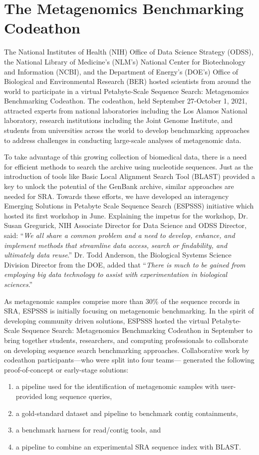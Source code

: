 \section{The Metagenomics Benchmarking Codeathon}
\label{sec:psss-codeathon}

The National Institutes of Health (NIH) Office of Data Science Strategy (ODSS), the National Library of Medicine’s (NLM’s) National Center for Biotechnology and Information (NCBI), and the Department of Energy’s (DOE’s) Office of Biological and Environmental Research (BER) hosted scientists from around the world to participate in a virtual Petabyte-Scale Sequence Search: Metagenomics Benchmarking Codeathon. The codeathon, held September 27-October 1, 2021, attracted experts from national laboratories including the Los Alamos National laboratory, research institutions including the Joint Genome Institute, and students from universities across the world to develop benchmarking approaches to address challenges in conducting large-scale analyses of metagenomic data.

To take advantage of this growing collection of biomedical data, there is a need for efficient methods to search the archive using nucleotide sequences. Just as the introduction of tools like Basic Local Alignment Search Tool (BLAST) provided a key to unlock the potential of the GenBank archive, similar approaches are needed for SRA. Towards these efforts, we have developed an interagency Emerging Solutions in Petabyte Scale Sequence Search (ESPSSS) initiative which hosted its first workshop in June. Explaining the impetus for the workshop, Dr. Susan Gregurick, NIH Associate Director for Data Science and ODSS Director, said: “{\it We all share a common problem and a need to develop, enhance, and implement methods that streamline data access, search or findability, and ultimately data reuse}.” Dr. Todd Anderson, the Biological Systems Science Division Director from the DOE, added that “{\it There is much to be gained from employing big data technology to assist with experimentation in biological sciences}.”

As metagenomic samples comprise more than 30\% of the sequence records in SRA, ESPSSS is initially focusing on metagenomic benchmarking. In the spirit of developing community driven solutions, ESPSSS hosted the virtual Petabyte-Scale Sequence Search: Metagenomics Benchmarking Codeathon in September to bring together students, researchers, and computing professionals to collaborate on developing sequence search benchmarking approaches.
Collaborative work by codeathon participants—who were split into four teams— generated the following proof-of-concept or early-stage solutions:
\begin{enumerate}
    \item a pipeline used for the identification of metagenomic samples with user-provided long sequence queries,
    \item a gold-standard dataset and pipeline to benchmark contig containments,
    \item a benchmark harness for read/contig tools, and
    \item a pipeline to combine an experimental SRA sequence index with BLAST.
\end{enumerate}

